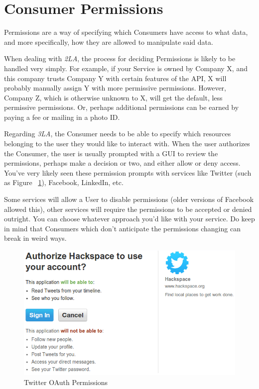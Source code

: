 \documentclass{book}
\begin{document}
\section{Consumer Permissions}

Permissions are a way of specifying which Consumers have access to what data, and more specifically, how they are allowed to manipulate said data.

When dealing with \emph{2LA}, the process for deciding Permissions is likely to be handled very simply. For example, if your Service is owned by Company X, and this company trusts Company Y with certain features of the API, X will probably manually assign Y with more permissive permissions. However, Company Z, which is otherwise unknown to X, will get the default, less permissive permissions. Or, perhaps additional permissions can be earned by paying a fee or mailing in a photo ID.

Regarding \emph{3LA}, the Consumer needs to be able to specify which resources belonging to the user they would like to interact with. When the user authorizes the Consumer, the user is usually prompted with a GUI to review the permissions, perhaps make a decision or two, and either allow or deny access. You've very likely seen these permission prompts with services like Twitter (such as Figure ~\ref{fig:twitteroauth}), Facebook, LinkedIn, etc.

Some services will allow a User to disable permissions (older versions of Facebook allowed this), other services will require the permissions to be accepted or denied outright. You can choose whatever approach you'd like with your service. Do keep in mind that Consumers which don't anticipate the permissions changing can break in weird ways.

\begin{figure}[ht!]
\centering
\includegraphics[width=120mm]{images/permissions-twitter.png}
\caption{Twitter OAuth Permissions}
\label{fig:twitteroauth}
\end{figure}
\end{document}

